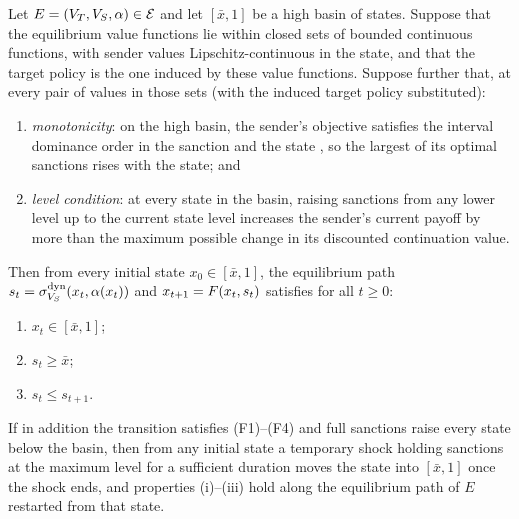 \begin{proposition}[Lock-in]
\label{prop:lock-in}
Let $E=(V_T,V_S,\alpha)\in\mathcal E$ and let $[\bar x,1]$ be a high basin of states.
Suppose that the equilibrium value functions lie within closed sets of bounded
continuous functions, with sender values Lipschitz-continuous in the state, and that
the target policy is the one induced by these value functions. Suppose further that, at
every pair of values in those sets (with the induced target policy substituted):
\begin{enumerate}[label=(\alph*)]
\item \emph{monotonicity}: on the high basin, the sender's objective satisfies the
interval dominance order in the sanction and the state \citep{QuahStrulovici2009}, so the largest of its optimal sanctions rises with the state; and
\item \emph{level condition}: at every state in the basin, raising sanctions from any
lower level up to the current state level increases the sender's current payoff by more
than the maximum possible change in its discounted continuation value.
\end{enumerate}
Then from every initial state $x_0\in[\bar x,1]$, the equilibrium path
$s_t=\sigma^{\mathrm{dyn}}_{V_S}(x_t,\alpha(x_t))$ and $x_{t+1}=F(x_t,s_t)$ satisfies for all
$t\ge0$:
\begin{enumerate}[label=(\roman*)]
\item $x_t\in[\bar x,1]$;
\item $s_t\ge\bar x$;
\item $s_t\le s_{t+1}$.
\end{enumerate}
If in addition the transition satisfies \textup{(F1)--(F4)} and full sanctions raise
every state below the basin, then from any initial state a temporary shock holding
sanctions at the maximum level for a sufficient duration moves the state into
$[\bar x,1]$ once the shock ends, and properties \textup{(i)--(iii)} hold along the
equilibrium path of $E$ restarted from that state.
\end{proposition}

